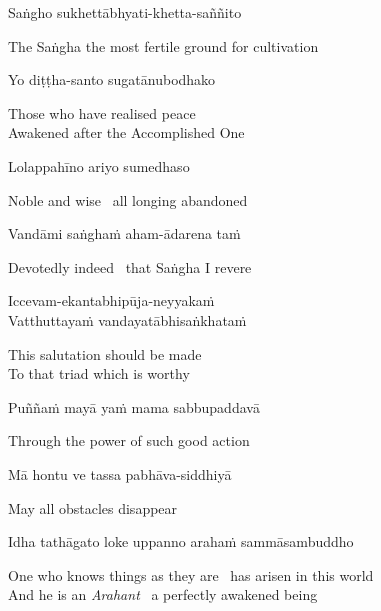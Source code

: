 Saṅgho sukhettābhyati-khetta-saññito

\begin{english}
  The Saṅgha the most fertile ground for cultivation
\end{english}

Yo diṭṭha-santo sugatānubodhako

\begin{english}
  Those who have realised peace\\
  Awakened after the Accomplished One
\end{english}

Lolappahīno ariyo sumedhaso

\begin{english}
  Noble and wise \breathmark\ all longing abandoned
\end{english}

Vandāmi saṅghaṁ aham-ādarena taṁ

\begin{english}
  Devotedly indeed \breathmark\ that Saṅgha I revere
\end{english}

  Iccevam-ekantabhipūja-neyyakaṁ\\
  Vatthuttayaṁ vandayatābhisaṅkhataṁ

\begin{english}
    This salutation should be made\\
  To that triad\makeatletter\hyperlink{endnote11-appendix}\makeatother
  which is worthy
\end{english}

Puññaṁ mayā yaṁ mama sabbupaddavā

\begin{english}
  Through the power of such good action
\end{english}

Mā hontu ve tassa pabhāva-siddhiyā

\begin{english}
  May all obstacles disappear
\end{english}

Idha tathāgato loke uppanno arahaṁ sammāsambuddho

\begin{english}
    One who knows things as they are \breathmark\ has arisen in this world\makeatletter\hyperlink{endnote12-appendix}\makeatother\\

  And he is an \textit{Arahant} \breathmark\ a perfectly awakened being
\end{english}

